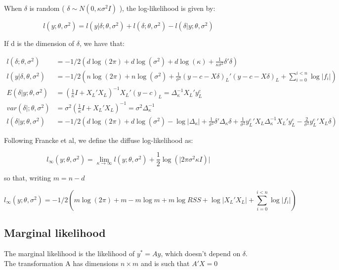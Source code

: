 \documentclass[
  letterpaper,
  DIV=11,
  numbers=noendperiod]{scrreprt}
\begin{document}
When \(\delta\) is random ( \(\delta \sim N(0, \kappa \sigma^2 I)\) ),
the log-likelihood is given by:

\[
l(y; \theta, \sigma^2) = l(y \vert \delta; \theta, \sigma^2) + l(\delta; \theta, \sigma^2) - l(\delta \vert y; \theta , \sigma^2)  
\]

If d is the dimension of \(\delta\), we have that:

\[
\begin{align*}
l(\delta; \theta, \sigma^2) &= -1/2 \left(d \log(2 \pi) + d \log(\sigma^2) + d \log(\kappa) + \frac{1}{\kappa \sigma^2}{\delta'\delta}  \right) \\
l(y \vert \delta, \theta, \sigma^2) &= -1/2\left(n \log(2 \pi) + n \log(\sigma^2)  +  \frac{1}{\sigma^2}(y -c - X \delta)_L'(y -c - X \delta)_L + \sum_{i=0}^{i<n} {\log \vert f_i \vert }\right) \\ 
E(\delta \vert y; \theta, \sigma^2) &= (\frac{1}{\kappa}I + {X_L}' X_L)^{-1}{X_L}'(y-c)_L = \Delta_\kappa^{-1}{X_L}'y^c_L \\
var(\delta \vert; \theta, \sigma^2) &= \sigma^2 (\frac{1}{\kappa}I + {X_L}' X_L)^{-1} = \sigma^2  \Delta_\kappa^{-1}\\
l(\delta \vert y; \theta , \sigma^2) &=  -1/2 \left(d \log(2 \pi) + d \log(\sigma^2) - \log \vert \Delta_\kappa \vert + \frac{1}{\sigma^2}\delta' \Delta_\kappa \delta + \frac{1}{\sigma^2}{y^c_L}'X_L \Delta_\kappa^{-1}{X_L}'y^c_L -\frac{2}{\sigma^2} {y^c_L}'X_L \delta  \right)
\end{align*}
\]

Following Francke et al, we define the diffuse log-likelihood as:

\[
l_\infty(y; \theta, \sigma^2) = \lim_{\kappa \rightarrow \infty}{l(y;\theta, \sigma^2) + \frac{1}{2}\log(\vert 2 \pi \sigma^2 \kappa I)  \vert} 
\]

so that, writing \(m=n-d\)

\[
l_\infty(y; \theta, \sigma^2) = -1/2 \left( m \log(2 \pi) + m - m \log m + m \log RSS + \log \vert {X_L}' X_L \vert + \sum_{i=0}^{i<n} {\log \vert f_i \vert }\right)
\]

\subsection{Marginal likelihood}\label{marginal-likelihood}

The marginal likelihood is the likelihood of \(y^*=Ay\), which doesn't
depend on \(\delta\). The transformation A has dimensions \(n\times m\)
and is such that \(A'X=0\)
\end{document}
